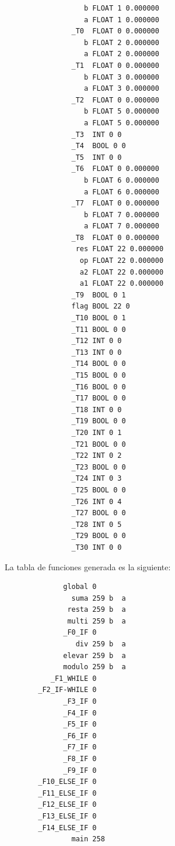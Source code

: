 \documentclass[a4paper,12pt]{article}
\begin{document}
\begin{enumerate}
 \begin{lstlisting} 
                   b FLOAT 1 0.000000
                   a FLOAT 1 0.000000
                _T0  FLOAT 0 0.000000
                   b FLOAT 2 0.000000
                   a FLOAT 2 0.000000
                _T1  FLOAT 0 0.000000
                   b FLOAT 3 0.000000
                   a FLOAT 3 0.000000
                _T2  FLOAT 0 0.000000
                   b FLOAT 5 0.000000
                   a FLOAT 5 0.000000
                _T3  INT 0 0
                _T4  BOOL 0 0
                _T5  INT 0 0
                _T6  FLOAT 0 0.000000
                   b FLOAT 6 0.000000
                   a FLOAT 6 0.000000
                _T7  FLOAT 0 0.000000
                   b FLOAT 7 0.000000
                   a FLOAT 7 0.000000
                _T8  FLOAT 0 0.000000
                 res FLOAT 22 0.000000
                  op FLOAT 22 0.000000
                  a2 FLOAT 22 0.000000
                  a1 FLOAT 22 0.000000
                _T9  BOOL 0 1
                flag BOOL 22 0
                _T10 BOOL 0 1
                _T11 BOOL 0 0
                _T12 INT 0 0
                _T13 INT 0 0
                _T14 BOOL 0 0
                _T15 BOOL 0 0
                _T16 BOOL 0 0
                _T17 BOOL 0 0
                _T18 INT 0 0
                _T19 BOOL 0 0
                _T20 INT 0 1
                _T21 BOOL 0 0
                _T22 INT 0 2
                _T23 BOOL 0 0
                _T24 INT 0 3
                _T25 BOOL 0 0
                _T26 INT 0 4
                _T27 BOOL 0 0
                _T28 INT 0 5
                _T29 BOOL 0 0
                _T30 INT 0 0
 \end{lstlisting}

  La tabla de funciones generada es la siguiente:
  
  \begin{lstlisting}
              global 0
                suma 259 b  a 
               resta 259 b  a 
               multi 259 b  a 
              _F0_IF 0
                 div 259 b  a 
              elevar 259 b  a 
              modulo 259 b  a 
           _F1_WHILE 0
        _F2_IF-WHILE 0
              _F3_IF 0
              _F4_IF 0
              _F5_IF 0
              _F6_IF 0
              _F7_IF 0
              _F8_IF 0
              _F9_IF 0
        _F10_ELSE_IF 0
        _F11_ELSE_IF 0
        _F12_ELSE_IF 0
        _F13_ELSE_IF 0
        _F14_ELSE_IF 0
                main 258
  \end{lstlisting}


\end{enumerate}
\end{document}
